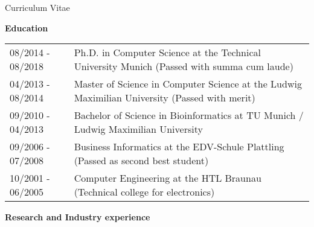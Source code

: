 \documentclass{resume} %
\begin{document}


\setcounter{tocdepth}{1}

\pagestyle{plain}
\setcounter{page}{1}

\setlength{\oddsidemargin}{-0.2cm}
\setlength{\evensidemargin}{-0.2cm}
\setlength{\linewidth}{16.5cm}
\setlength{\textheight}{26cm}
\setlength{\tabcolsep}{0cm}


\begin{rSection}{Curriculum Vitae}
\vspace{2mm}

{\bf Education}\vspace{1mm}

\begin{tabular}{p{3.6cm}p{13.0cm}}
08/2014 - 08/2018 & Ph.D. in Computer Science at the Technical University Munich (Passed with summa cum laude)
\\[1.mm]
04/2013 - 08/2014 & Master of Science in Computer Science at the Ludwig Maximilian University (Passed with merit)
\\[1.mm]
09/2010 - 04/2013 & Bachelor of Science in Bioinformatics at TU Munich / Ludwig Maximilian University 
\\[1.mm]
09/2006 - 07/2008 & Business Informatics at the EDV-Schule Plattling  (Passed as second best student)
\\[1.mm]
10/2001 - 06/2005 & Computer Engineering at the HTL Braunau (Technical college for electronics) 
\\[1mm]
\end{tabular}
\vspace{1mm}

{\bf Research and Industry experience}\vspace{1mm}


\end{rSection}
\end{document}
